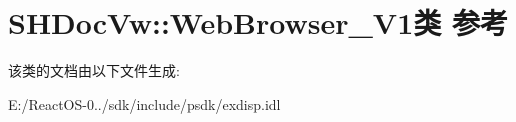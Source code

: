 \hypertarget{class_s_h_doc_vw_1_1_web_browser___v1}{}\section{S\+H\+Doc\+Vw\+:\+:Web\+Browser\+\_\+\+V1类 参考}
\label{class_s_h_doc_vw_1_1_web_browser___v1}


该类的文档由以下文件生成\+:\begin{DoxyCompactItemize}
\item 
E\+:/\+React\+O\+S-\/0../sdk/include/psdk/exdisp.\+idl\end{DoxyCompactItemize}
